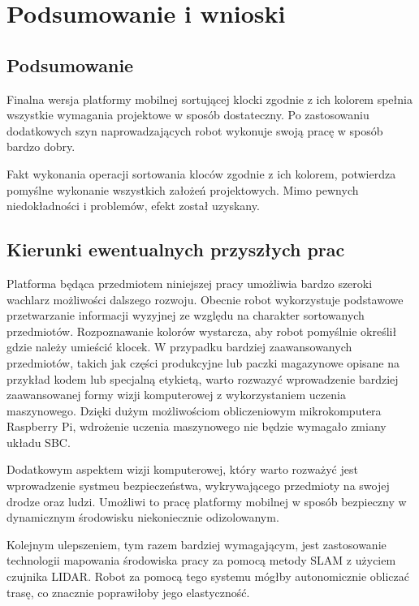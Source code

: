 \chapter{Podsumowanie i wnioski}

\section{Podsumowanie}

Finalna wersja platformy mobilnej sortującej klocki zgodnie z ich kolorem spełnia wszystkie wymagania projektowe w sposób dostateczny. Po zastosowaniu dodatkowych szyn naprowadzających robot wykonuje swoją pracę w sposób bardzo dobry. 

Fakt wykonania operacji sortowania kloców zgodnie z ich kolorem, potwierdza pomyślne wykonanie wszystkich założeń projektowych. Mimo pewnych niedokładności i problemów, efekt został uzyskany. 

\section{Kierunki ewentualnych przyszłych prac}

Platforma będąca przedmiotem niniejszej pracy umożliwia bardzo szeroki wachlarz możliwości dalszego rozwoju. Obecnie robot wykorzystuje podstawowe przetwarzanie informacji wyzyjnej ze względu na charakter sortowanych przedmiotów. Rozpoznawanie kolorów wystarcza, aby robot pomyślnie określił gdzie należy umieścić klocek. W przypadku bardziej zaawansowanych przedmiotów, takich jak części produkcyjne lub paczki magazynowe opisane na przykład kodem lub specjalną etykietą, warto rozwazyć wprowadzenie bardziej zaawansowanej formy wizji komputerowej z wykorzystaniem uczenia maszynowego. Dzięki dużym możliwościom obliczeniowym mikrokomputera Raspberry Pi, wdrożenie uczenia maszynowego nie będzie wymagało zmiany układu SBC. 

Dodatkowym aspektem wizji komputerowej, który warto rozważyć jest wprowadzenie systmeu bezpieczeństwa, wykrywającego przedmioty na swojej drodze oraz ludzi. Umożliwi to pracę platformy mobilnej w sposób bezpieczny w dynamicznym środowisku niekoniecznie odizolowanym. 

\vspace*{l}

Kolejnym ulepszeniem, tym razem bardziej wymagającym, jest zastosowanie technologii mapowania środowiska pracy za pomocą metody SLAM z użyciem czujnika LIDAR. Robot za pomocą tego systemu mógłby autonomicznie obliczać trasę, co znacznie poprawiłoby jego elastyczność. 


